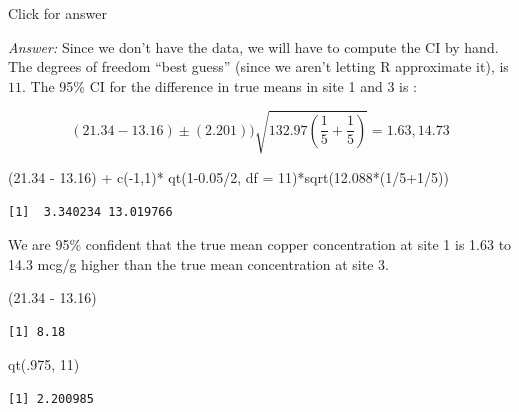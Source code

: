 \documentclass[
]{book}
\newenvironment{Shaded}{\begin{snugshade}}{\end{snugshade}}
\newcommand{\AttributeTok}[1]{\textcolor[rgb]{0.77,0.63,0.00}{#1}}
\newcommand{\DecValTok}[1]{\textcolor[rgb]{0.00,0.00,0.81}{#1}}
\newcommand{\FloatTok}[1]{\textcolor[rgb]{0.00,0.00,0.81}{#1}}
\newcommand{\FunctionTok}[1]{\textcolor[rgb]{0.00,0.00,0.00}{#1}}
\newcommand{\NormalTok}[1]{#1}
\newcommand{\SpecialCharTok}[1]{\textcolor[rgb]{0.00,0.00,0.00}{#1}}
\begin{document}
Click for answer

\emph{Answer:} Since we don't have the data, we will have to compute the CI by hand. The degrees of freedom ``best guess'' (since we aren't letting R approximate it), is \(11\). The 95\% CI for the difference in true means in site 1 and 3 is :

\[
(21.34 - 13.16)  \pm (2.201)) \sqrt{132.97\left(\dfrac{1}{5} + \dfrac{1}{5}\right)} = 1.63, 14.73
\]

\begin{Shaded}
\begin{Highlighting}[]
\NormalTok{(}\FloatTok{21.34} \SpecialCharTok{{-}} \FloatTok{13.16}\NormalTok{) }\SpecialCharTok{+} \FunctionTok{c}\NormalTok{(}\SpecialCharTok{{-}}\DecValTok{1}\NormalTok{,}\DecValTok{1}\NormalTok{)}\SpecialCharTok{*} \FunctionTok{qt}\NormalTok{(}\DecValTok{1}\FloatTok{{-}0.05}\SpecialCharTok{/}\DecValTok{2}\NormalTok{, }\AttributeTok{df =} \DecValTok{11}\NormalTok{)}\SpecialCharTok{*}\FunctionTok{sqrt}\NormalTok{(}\FloatTok{12.088}\SpecialCharTok{*}\NormalTok{(}\DecValTok{1}\SpecialCharTok{/}\DecValTok{5}\SpecialCharTok{+}\DecValTok{1}\SpecialCharTok{/}\DecValTok{5}\NormalTok{))}
\end{Highlighting}
\end{Shaded}

\begin{verbatim}
[1]  3.340234 13.019766
\end{verbatim}

We are 95\% confident that the true mean copper concentration at site 1 is 1.63 to 14.3 mcg/g higher than the true mean concentration at site 3.

\begin{Shaded}
\begin{Highlighting}[]
\NormalTok{(}\FloatTok{21.34} \SpecialCharTok{{-}} \FloatTok{13.16}\NormalTok{) }
\end{Highlighting}
\end{Shaded}

\begin{verbatim}
[1] 8.18
\end{verbatim}

\begin{Shaded}
\begin{Highlighting}[]
\FunctionTok{qt}\NormalTok{(.}\DecValTok{975}\NormalTok{, }\DecValTok{11}\NormalTok{)}
\end{Highlighting}
\end{Shaded}

\begin{verbatim}
[1] 2.200985
\end{verbatim}
\end{document}
